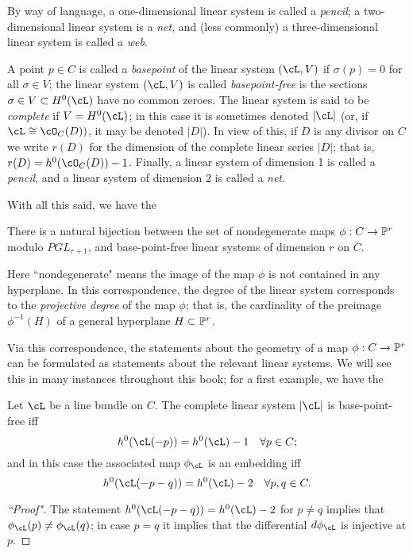 By way of language, a one-dimensional linear system is called a \emph{pencil}; a two-dimensional linear system is a \emph{net}, and (less commonly) a three-dimensional linear system is called a \emph{web}.

A point $p \in C$ is called a \emph{basepoint} of the linear system $(\cL,V)$ if $\sigma(p)=0$ for all $\sigma \in V$; the linear system $(\cL,V)$ is called \emph{basepoint-free} is the sections $\sigma \in V \subset H^0(\cL)$ have no common zeroes. The linear system is said to be \emph{complete} if $V = H^0(\cL)$; in this case it is sometimes denoted $|\cL|$ (or, if $\cL \cong \cO_C(D))$, it may be denoted $|D|$). In view of this, if $D$ is any divisor on $C$ we write $r(D)$ for the dimension of the complete linear series $|D|$; that is, $r(D) = h^0(\cO_C(D)) - 1$. Finally, a linear system of dimension 1 is called a \emph{pencil}, and a linear system of dimension 2 is called a \emph{net}.

With all this said, we have the 

\begin{proposition}
There is a natural bijection between the set of nondegenerate maps $\phi : C \to \PP^r$ modulo $PGL_{r+1}$, and base-point-free linear systems of dimension $r$ on $C$.
\end{proposition}

Here ``nondegenerate" means the image of the map $\phi$ is not contained in any hyperplane. In this correspondence, the degree of the linear system corresponds to the \emph{projective degree} of the map $\phi$; that is, the cardinality of the preimage $\phi^{-1}(H)$ of a general hyperplane $H \subset \PP^r$.

Via this correspondence, the statements about the geometry of a map $\phi : C \to \PP^r$ can be formulated as statements about the relevant linear systems. We will see this in many instances throughout this book; for a first example, we have the

\begin{proposition}\label{very ample}
Let $\cL$ be a line bundle on $C$. The complete linear system $|\cL|$ is base-point-free iff
$$
h^0(\cL(-p)) = h^0(\cL) - 1 \quad \forall p \in C;
$$
and in this case the associated map $\phi_\cL$ is an embedding iff
$$
h^0(\cL(-p-q)) = h^0(\cL) - 2 \quad \forall p, q \in C.
$$
\end{proposition} 

\begin{proof}[``Proof"]
The statement $h^0(\cL(-p-q)) = h^0(\cL) - 2$ for $p \neq q$ implies that $\phi_\cL(p) \neq \phi_\cL(q)$; in case $p=q$ it implies that the differential $d\phi_\cL$ is injective at $p$.
\end{proof}

